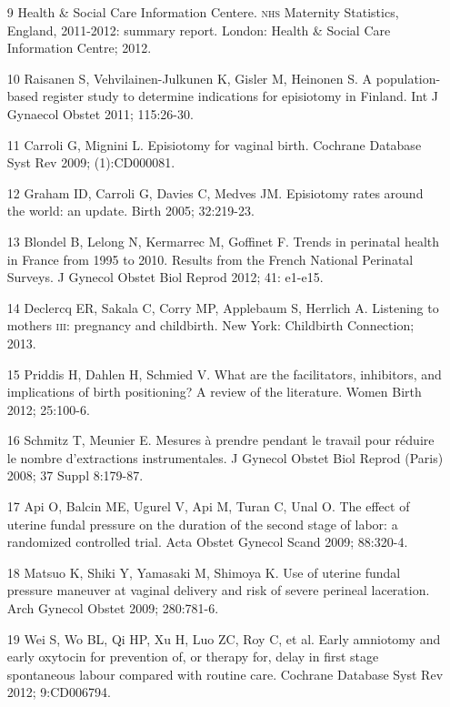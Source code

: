 \documentclass{article}
\begin{document}
\begin{itemize}
\item[9] Health \& Social Care Information Centere. \textsc{nhs} Maternity
Statistics, England, 2011-2012: summary report. London: Health \& Social Care
Information Centre; 2012.

\item[10] Raisanen S, Vehvilainen-Julkunen K, Gisler M, Heinonen S. A
population-based register study to determine indications for episiotomy in
Finland. Int J Gynaecol Obstet 2011; 115:26-30.

\item[11] Carroli G, Mignini L. Episiotomy for vaginal birth. Cochrane
Database Syst Rev 2009; (1):CD000081.

\item[12] Graham ID, Carroli G, Davies C, Medves JM. Episiotomy rates around
the world: an update. Birth 2005; 32:219-23.

\item[13] Blondel B, Lelong N, Kermarrec M, Goffinet F. Trends in perinatal
health in France from 1995 to 2010. Results from the French National Perinatal
Surveys. J Gynecol Obstet Biol Reprod 2012; 41: e1-e15.

\item[14] Declercq ER, Sakala C, Corry MP, Applebaum S, Herrlich A. Listening
to mothers \textsc{iii}: pregnancy and childbirth. New York: Childbirth Connection;
2013.

\item[15] Priddis H, Dahlen H, Schmied V. What are the facilitators,
inhibitors, and implications of birth positioning? A review of the literature.
Women Birth 2012; 25:100-6.

\item[16] Schmitz T, Meunier E. Mesures à prendre pendant le travail pour
réduire le nombre d’extractions instrumentales. J Gynecol Obstet Biol Reprod
(Paris) 2008; 37 Suppl 8:179-87.

\item[17] Api O, Balcin ME, Ugurel V, Api M, Turan C, Unal O. The effect of
uterine fundal pressure on the duration of the second stage of labor: a
randomized controlled trial. Acta Obstet Gynecol Scand 2009;
88:320-4.

\item[18] Matsuo K, Shiki Y, Yamasaki M, Shimoya K. Use of uterine fundal
pressure maneuver at vaginal delivery and risk of severe perineal laceration.
Arch Gynecol Obstet 2009; 280:781-6.

\item[19] Wei S, Wo BL, Qi HP, Xu H, Luo ZC, Roy C, et al. Early amniotomy
and early oxytocin for prevention of, or therapy for, delay in first stage
spontaneous labour compared with routine care. Cochrane Database Syst Rev 2012;
9:CD006794.


\end{itemize}
\end{document}
